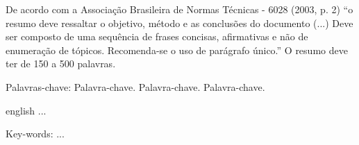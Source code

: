 \documentclass[12pt,openany,oneside,a4paper,english,brazil]{abntbibufjf}
\begin{document}


\setlength{\absparsep}{18pt}
\begin{resumo}
De acordo com a Associa\c{c}\~ao Brasileira de Normas T\'ecnicas - 6028 (2003, p. 2) ``o resumo deve ressaltar
o objetivo, m\'etodo e as conclus\~oes do documento (...) Deve ser composto de uma sequ\^encia de frases
concisas, afirmativas e n\~ao de enumera\c{c}\~ao de t\'opicos. Recomenda-se o uso de par\'agrafo \'unico.''
O resumo deve ter de 150 a 500 palavras.

Palavras-chave: Palavra-chave. Palavra-chave. Palavra-chave. %

\end{resumo}


\begin{resumo}[ABSTRACT]
 \begin{otherlanguage*}{english}
 ...

Key-words: ...
 \end{otherlanguage*}
\end{resumo}


\listoffigures*
\cleardoublepage
\end{document}
